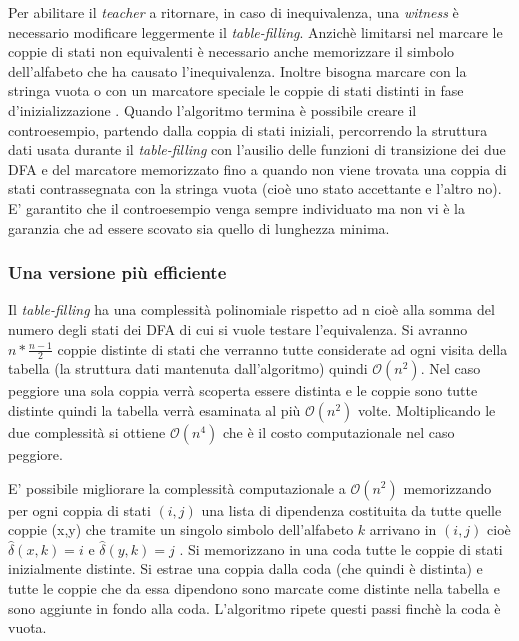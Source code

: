 Per abilitare il \textit{teacher} a ritornare, in caso di inequivalenza, una \textit{witness} è necessario modificare leggermente il \textit{table-filling}. Anzichè limitarsi nel marcare le coppie di stati non equivalenti è necessario anche memorizzare il simbolo dell'alfabeto che ha causato l'inequivalenza. Inoltre bisogna marcare con la stringa vuota o con un marcatore speciale le coppie di stati distinti in fase d'inizializzazione . Quando l'algoritmo termina è possibile creare il controesempio, partendo dalla coppia di stati iniziali, percorrendo la struttura dati usata durante il \textit{table-filling} con l'ausilio delle funzioni di transizione dei due DFA e del marcatore memorizzato fino a quando non viene trovata una coppia di stati contrassegnata con la stringa vuota (cioè uno stato accettante e l'altro no). E' garantito che il controesempio venga sempre individuato ma non vi è la garanzia che ad essere scovato sia quello di lunghezza minima.
\subsubsection{Una versione più efficiente}
Il \textit{table-filling} ha una complessità polinomiale rispetto ad n cioè alla somma del numero degli stati dei DFA di cui si vuole testare l'equivalenza. Si avranno $n*\frac{n-1}{2}$  coppie distinte di stati che verranno tutte considerate ad ogni visita della tabella (la struttura dati mantenuta dall'algoritmo) quindi $\mathcal{O}(n^{2})$. Nel caso peggiore una sola coppia verrà scoperta essere distinta e le coppie sono tutte distinte quindi la tabella verrà esaminata al più $\mathcal{O}(n^{2})$ volte. Moltiplicando le due complessità si ottiene $\mathcal{O}(n^{4})$ che è il costo computazionale nel caso peggiore.

E' possibile migliorare la complessità computazionale a $\mathcal{O}(n^{2})$ memorizzando per ogni coppia di stati $(i,j)$ una lista di dipendenza costituita da tutte quelle coppie (x,y) che tramite un singolo simbolo dell'alfabeto $k$ arrivano in $(i,j)$ cioè $\hat{\delta}(x,k)=i$ e $\hat{\delta}(y,k)=j$ .
Si memorizzano in una coda tutte le coppie di stati inizialmente distinte. Si estrae una coppia dalla coda (che quindi è distinta) e tutte le coppie che da essa dipendono sono marcate come distinte nella tabella e sono aggiunte in fondo alla coda. L'algoritmo ripete questi passi finchè la coda è vuota.